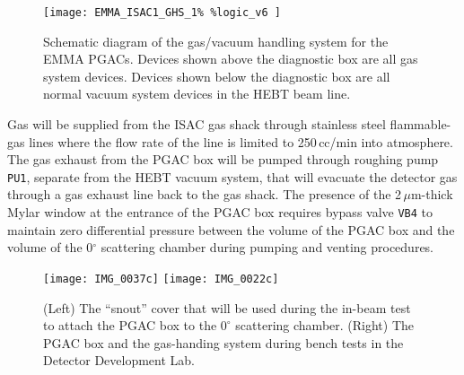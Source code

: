 
\begin{figure}[t]
\centerline{
\texttt{[image: EMMA\_ISAC1\_GHS\_1\%
\%logic\_v6
]}
}
\caption{Schematic diagram of the gas/vacuum handling system for the EMMA PGACs.
Devices shown above the diagnostic box are all gas system devices. Devices shown below the diagnostic box are all normal vacuum system devices in the HEBT beam line.
}
\label{diagram}
\end{figure}

Gas will be supplied from the ISAC gas shack through stainless steel flammable-gas lines where the
flow rate of the line is limited to 250\,cc/min into atmosphere. The gas exhaust from the
PGAC box will be pumped through roughing pump \texttt{PU1}, separate from the HEBT vacuum system, that will evacuate the detector gas through a gas exhaust line back to the gas shack.
The presence of the 2\,$\mu$m-thick Mylar window at the entrance of the PGAC box requires bypass valve \texttt{VB4}
to maintain zero differential pressure between the volume of the PGAC box and the volume of  the 0$^\circ$ scattering chamber
during pumping and venting procedures.

\begin{figure}[t]%
\centering
\hspace{\fill}
\texttt{[image: IMG\_0037c]} \hspace{\fill}
\texttt{[image: IMG\_0022c]} \hspace{\fill}
\caption{(Left) The ``snout'' cover that will be used during the in-beam test to attach the PGAC box to the $0^\circ$ scattering chamber. (Right) The PGAC box and the gas-handing system during bench tests in the Detector Development Lab.}%
\label{photos}%
\end{figure}
